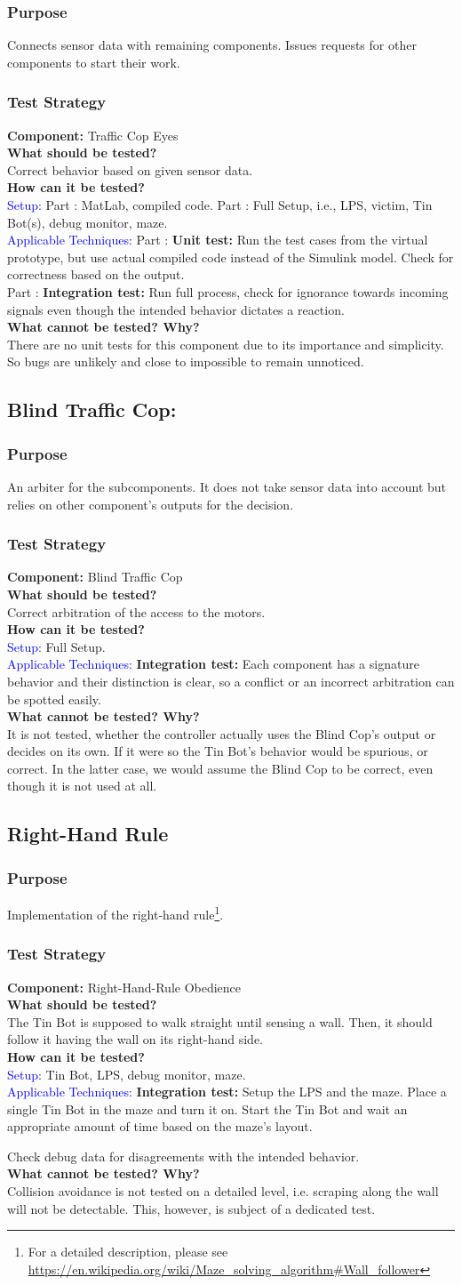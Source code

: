 \documentclass[a4paper,parskip,headheight=38pt]{scrartcl} %
\newcommand*{\rom}[1]{\uppercase\expandafter{\romannumeral #1\relax}}
\newcommand{\teststrat}[5]{
    \subsubsection{Test Strategy}
	\textbf{Component:} #1 \\
	\noindent\textbf{What should be tested?} \\
    \noindent #2 \\
	\noindent\textbf{How can it be tested?} \\
    \noindent\textcolor{blue}{Setup:} #3 \\
    \noindent\textcolor{blue}{Applicable Techniques:} #4 \\
	\noindent\textbf{What cannot be tested? Why?} \\
    \noindent #5
}
\newcommand{\ie}{i.e.}
\newcommand{\BLACK}{\textbf{Integration test: }}
\newcommand{\WHITE}{\textbf{Unit test: }}
\begin{document}
\subsubsection{Purpose}
Connects sensor data with remaining components. Issues requests for other
components to start their work.
\teststrat{Traffic Cop Eyes}{
    Correct behavior based on given sensor data.
}{
    Part \rom{1}: MatLab, compiled code. Part \rom{2}: Full Setup, \ie, LPS,
    victim, Tin Bot(s), debug monitor, maze.
}{
    Part \rom{1}: \WHITE Run the test cases from the virtual prototype, but use
    actual
    compiled code instead of the Simulink model. Check for correctness based
    on the output. \\
    Part \rom{2}: \BLACK Run full process, check for ignorance towards incoming
    signals
    even though the intended behavior dictates a reaction. 
}{
    There are no unit tests for this component due to its importance and
    simplicity. So bugs are unlikely and close to impossible to remain
    unnoticed.
}
%
\subsection{Blind Traffic Cop:}
\subsubsection{Purpose}
An arbiter for the subcomponents. It does not take sensor data into account but
relies on other component's outputs for the decision.
\teststrat{Blind Traffic Cop}{
    Correct arbitration of the access to the motors.
}{
    Full Setup.
}{
    \BLACK Each component has a signature behavior and
    their distinction is clear, so a conflict or an incorrect arbitration can be
    spotted easily.
}{
    It is not tested, whether the controller actually uses the Blind Cop's
    output or decides on its own. If it were so the Tin Bot's behavior would be
    spurious, or correct. In the latter case, we would assume the Blind Cop to
    be correct, even though it is not used at all.
}
%
\subsection{Right-Hand Rule}
\subsubsection{Purpose}
Implementation of the right-hand rule\footnote{For a detailed description,
please see 
\url{https://en.wikipedia.org/wiki/Maze_solving_algorithm\#Wall_follower}
}.
\teststrat{Right-Hand-Rule Obedience}{
    The Tin Bot is supposed to walk straight until sensing a wall. Then, it
    should follow it having the wall on its right-hand side.
}{
    Tin Bot, LPS, debug monitor, maze.
}{
    \BLACK Setup the LPS and the maze. Place a single Tin Bot in the maze and
    turn it
    on. Start the Tin Bot and wait an appropriate amount of time based on the
    maze's layout.

    Check debug data for disagreements with the intended behavior.
}{
    Collision avoidance is not tested on a detailed level, i.e. scraping along
    the wall will not be detectable. This, however, is subject of a dedicated
    test.
}
%
\end{document}
